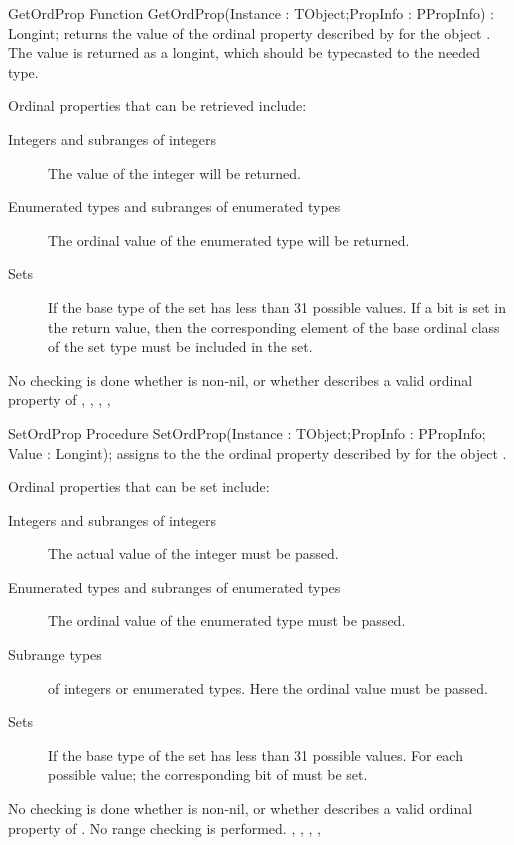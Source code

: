 \begin{function}{GetOrdProp}
\Declaration
Function GetOrdProp(Instance : TObject;PropInfo : PPropInfo) : Longint;
\Description
{} returns the value of the ordinal property described by
 for the object . The value is returned as a
longint, which should be typecasted to the needed type.

Ordinal properties that can be retrieved include:
\begin{description}
\item[Integers and subranges of integers] The value of the integer will be
returned.
\item[Enumerated types and subranges of enumerated types] The ordinal value
of the enumerated type will be returned.
\item[Sets] If the base type of the set has less than 31 possible values.
If a bit is set in the return value, then the corresponding element of the
base ordinal class of the set type must be included in the set.
\end{description}
\Errors
No checking is done whether  is non-nil, or whether
 describes a valid ordinal property of 
\SeeAlso
{}, , ,
,

\end{function}


\begin{procedure}{SetOrdProp}
\Declaration
Procedure SetOrdProp(Instance : TObject;PropInfo : PPropInfo; Value : Longint);
\Description
{} assigns  to the the ordinal property described by 
 for the object . 

Ordinal properties that can be set include:
\begin{description}
\item[Integers and subranges of integers] The actual value of the integer must be 
passed.
\item[Enumerated types and subranges of enumerated types] The ordinal value
of the enumerated type must be passed.
\item[Subrange types] of integers or enumerated types. Here the ordinal
value must be passed.
\item[Sets] If the base type of the set has less than 31 possible values.
For each possible value; the corresponding bit of  must be set.
\end{description}
\Errors
No checking is done whether  is non-nil, or whether
 describes a valid ordinal property of . 
No range checking is performed.
\SeeAlso
{}, , ,
,
\end{procedure}


